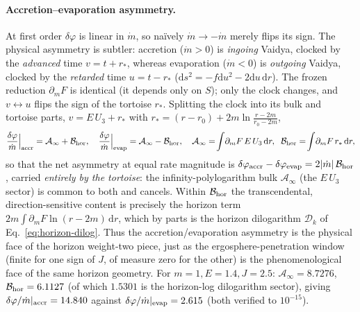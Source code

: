 \documentclass[12pt]{iopart}
\newcommand{\dd}{\mathrm{d}}
\begin{document}
\paragraph{Accretion--evaporation asymmetry.} At first order $\delta\varphi$ is
linear in $\dot m$, so na\"ively $\dot m\to-\dot m$ merely flips its sign. The
physical asymmetry is subtler: accretion ($\dot m>0$) is \emph{ingoing} Vaidya,
clocked by the \emph{advanced} time $v=t+r_*$, whereas evaporation ($\dot m<0$) is
\emph{outgoing} Vaidya, clocked by the \emph{retarded} time $u=t-r_*$
($\dd s^2=-f\dd u^2-2\dd u\,\dd r$). The frozen reduction $\partial_m F$ is identical
(it depends only on $S$); only the clock changes, and $v\leftrightarrow u$ flips the
sign of the tortoise $r_*$. Splitting the clock into its bulk and tortoise parts,
$v=E\,U_3+r_*$ with $r_*=(r-r_0)+2m\ln\!\frac{r-2m}{r_0-2m}$,
\begin{equation}
    \frac{\delta\varphi}{\dot m}\Big|_{\rm accr}=\mathcal{A}_\infty+\mathcal{B}_{\rm hor},
    \quad
    \frac{\delta\varphi}{\dot m}\Big|_{\rm evap}=\mathcal{A}_\infty-\mathcal{B}_{\rm hor},
    \quad
    \mathcal{A}_\infty=\!\int\!\partial_m F\,E\,U_3\,\dd r,\;\;
    \mathcal{B}_{\rm hor}=\!\int\!\partial_m F\,r_*\,\dd r,
    \label{eq:vaidya-asymmetry}
\end{equation}
so that the net asymmetry at equal rate magnitude is
$\delta\varphi_{\rm accr}-\delta\varphi_{\rm evap}=2|\dot m|\,\mathcal{B}_{\rm hor}$,
carried \emph{entirely by the tortoise}: the infinity-polylogarithm bulk
$\mathcal{A}_\infty$ (the $E\,U_3$ sector) is common to both and cancels. Within
$\mathcal{B}_{\rm hor}$ the transcendental, direction-sensitive content is precisely
the horizon term $2m\!\int\!\partial_m F\ln(r-2m)\,\dd r$, which by parts is the
horizon dilogarithm $\mathcal{D}_k$ of Eq.~\eqref{eq:horizon-dilog}. Thus the
accretion/evaporation asymmetry is the physical face of the horizon weight-two piece,
just as the ergosphere-penetration window (finite for one sign of $J$, of measure zero
for the other) is the phenomenological face of the same horizon geometry. For
$m=1,E=1.4,J=2.5$: $\mathcal{A}_\infty=8.7276$, $\mathcal{B}_{\rm hor}=6.1127$ (of which
$1.5301$ is the horizon-log dilogarithm sector), giving
$\delta\varphi/\dot m|_{\rm accr}=14.840$ against
$\delta\varphi/\dot m|_{\rm evap}=2.615$ (both verified to $10^{-15}$).


\end{document}
